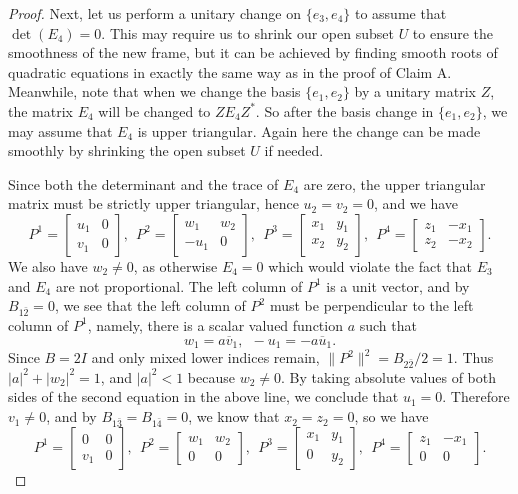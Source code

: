 \documentclass{amsart}
\begin{document}
\begin{proof}
\vspace{0.2cm}

Next, let us perform a unitary change on $\{ e_3, e_4\}$ to assume that $\det(E_4)=0$. This may require us to shrink our open subset $U$ to ensure the smoothness of the new frame, but it can be achieved by finding smooth roots of quadratic equations in exactly the same way as in the proof of Claim A. Meanwhile, note that when we change the basis $\{ e_1, e_2\}$  by a unitary matrix $Z$, the matrix $E_4$  will be changed to $ZE_4Z^{\ast}$. So after the basis change in $\{ e_1, e_2\}$, we may assume that $E_4$ is upper triangular. Again here the change can be made smoothly by shrinking the open subset $U$ if needed.

Since  both the determinant and  the trace of $E_4$ are zero, the upper triangular matrix must be strictly upper triangular, hence $u_2=v_2=0$, and we have
$$ P^1 = \left[ \begin{array}{cc} u_1 & 0 \\ v_1 & 0 \end{array} \right], \ \ P^2 = \left[ \begin{array}{cc} w_1 & w_2 \\ -u_1 & 0 \end{array} \right],\ \  P^3 = \left[ \begin{array}{cc} x_1 & y_1 \\ x_2 & y_2 \end{array} \right], \ \ P^4 = \left[ \begin{array}{cc} z_1 & -x_1 \\ z_2 & -x_2 \end{array} \right]. $$
We also have $w_2\neq 0$, as otherwise $E_4=0$ which would violate the fact that $E_3$ and $E_4$ are not proportional. The left column of $P^1$ is a unit vector, and by $B_{1\bar{2}}=0$, we see that the left column of $P^2$ must be perpendicular to the left column of $P^1$, namely, there is a scalar valued function $a$ such that
$$ w_1= a\overline{v}_1, \ \ -u_1 =-a\overline{u}_1. $$
Since $B=2I$ and only mixed lower indices remain, $\|P^2\|^2=B_{2\bar{2}}/2=1$. Thus $|a|^2+|w_2|^2=1$, and $|a|^2<1$ because $w_2\neq 0$. By taking absolute values of both sides of the second equation in the above line, we conclude that $u_1=0$. Therefore $v_1\neq 0$, and by $B_{1\bar{3}}=B_{1\bar{4}}=0$, we know that $x_2=z_2=0$, so we have
$$ P^1 = \left[ \begin{array}{cc} 0 & 0 \\ v_1 & 0 \end{array} \right], \ \ P^2 = \left[ \begin{array}{cc} w_1 & w_2 \\ 0 & 0 \end{array} \right],\ \  P^3 = \left[ \begin{array}{cc} x_1 & y_1 \\ 0 & y_2 \end{array} \right], \ \ P^4 = \left[ \begin{array}{cc} z_1 & -x_1 \\ 0 & 0 \end{array} \right]. $$

\end{proof}
\end{document}
